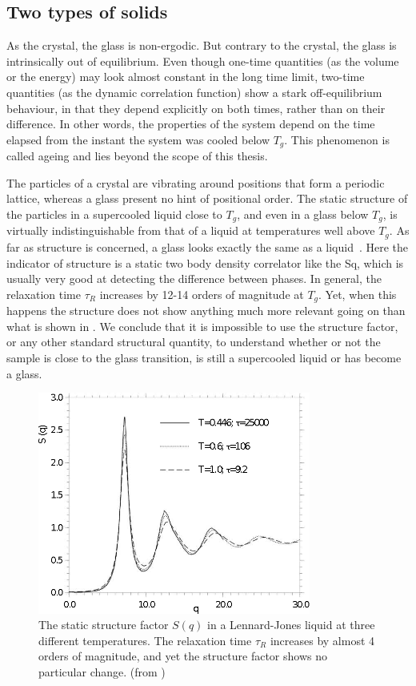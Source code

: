 \subsection{Two types of solids}
\label{sec:X+glass}

As the crystal, the glass is non-ergodic. But contrary to the crystal, the glass is intrinsically out of equilibrium. Even though one-time quantities (as the volume or the energy) may look almost constant in the long time limit, two-time quantities (as the dynamic correlation function) show a stark off-equilibrium behaviour, in that they depend explicitly on both times, rather than on their difference. In other words, the properties of the system depend on the time elapsed from the instant the system was cooled below $T_g$. This phenomenon is called ageing and lies beyond the scope of this thesis.

The particles of a crystal are vibrating around positions that form a periodic lattice, whereas a glass present no hint of positional order. The static structure of the particles in a supercooled liquid close to $T_g$, and even in a glass below $T_g$, is virtually indistinguishable from that of a liquid at temperatures well above $T_g$. As far as structure is concerned, a glass looks exactly the same as a liquid~\citep{Ernst1991, Leheny1996, PRICE1987, vanblaaderen1995rss}. Here the indicator of structure is a static two body density correlator like the \ac{Sq}, which is usually very good at detecting the difference between phases. In general, the relaxation time $\tau_R$ increases by 12-14 orders of magnitude at $T_g$. Yet, when this happens the structure does not show anything much more relevant going on than what is shown in . We conclude that it is impossible to use the structure factor, or any other standard structural quantity, to understand whether or not the sample is close to the glass transition, is still a supercooled liquid or has become a glass.

\begin{figure}
	\centering
	\includegraphics[width=0.8\textwidth]{sq_kob}
	\caption{The static structure factor $S(q)$ in a Lennard-Jones liquid at three different temperatures. The relaxation time $\tau_R$ increases by almost 4 orders of magnitude, and yet the structure factor shows no particular change. (from \citep{Kob2002})}
	\label{fig:rdf_glass}
\end{figure}

